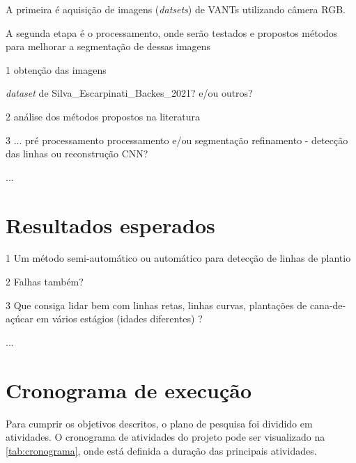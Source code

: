 \documentclass[12pt, a4paper, english, brazil]{article}
\newcommand{\textRed}[1]{{{\color{red} #1}}}
\newcommand{\textBlue}[1]{{{\color{blue} #1}}}
\begin{document}
A primeira é aquisição de imagens (\textit{datsets}) de VANTs \textRed{utilizando câmera RGB}.

A segunda etapa é o processamento, onde serão testados e propostos métodos para melhorar a segmentação de dessas imagens



\textBlue{
1 obtenção das imagens

    \textit{dataset} de Silva\_Escarpinati\_Backes\_2021? e/ou outros?

2 análise dos métodos propostos na literatura

3 ...
    pré processamento
    processamento e/ou segmentação
    refinamento - detecção das linhas ou reconstrução
    CNN?

...
}

\section{Resultados esperados}

\textBlue{
1 Um método semi-automático ou automático para detecção de linhas de plantio

2 Falhas também?

3 Que consiga lidar bem com linhas retas, linhas curvas, plantações de cana-de-açúcar em vários estágios (idades diferentes) ?

...
}


\section{Cronograma de execução}

Para cumprir os objetivos descritos, o plano de pesquisa foi dividido em atividades. O cronograma de atividades do projeto pode ser visualizado na \autoref{tab:cronograma}, onde está definida a
duração das principais atividades.
\end{document}
